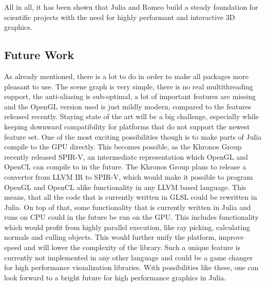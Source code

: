 All in all, it has been shown that Julia and Romeo build a steady foundation for scientific projects with the need for highly performant and interactive 3D graphics.

\subsection{Future Work}

As already mentioned, there is a lot to do in order to make all packages more pleasant to use.
The scene graph is very simple, there is no real multithreading support, the anti-aliasing is sub-optimal, a lot of important features are missing and the OpenGL version used is just mildly modern, compared to the features released recently. 
Staying state of the art will be a big challenge, especially while keeping downward compatibility for platforms that do not support the newest feature set.
One of the most exciting possibilities though is to make parts of Julia compile to the GPU directly. 
This becomes possible, as the Khronos Group recently released \ac{SPIR-V}, an intermediate representation which \ac{OpenGL} and \ac{OpenCL} can compile to in the future. The Khronos Group plans to release a converter from \ac{LLVM} \ac{IR} to \ac{SPIR-V}, which would make it possible to program \ac{OpenGL} and \ac{OpenCL} alike functionality in any \ac{LLVM} based language\cite{SpirV}.
This means, that all the code that is currently written in \ac{GLSL} could be rewritten in Julia. 
On top of that, some functionality that is currently written in Julia and runs on \ac{CPU} could in the future be run on the \ac{GPU}. This includes functionality which would profit from highly parallel execution, like ray picking, calculating normals and culling objects.
This would further unify the platform, improve speed and will lower the complexity of the library. 
Such a unique feature is currently not implemented in any other language and could be a game changer for high performance visualization libraries.
With possibilities like these, one can look forward to a bright future for high performance graphics in Julia.
